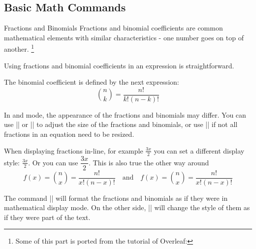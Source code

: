\subsection{Basic Math Commands}

\begin{frame}[fragile]{Fractions and Binomials}
Fractions and binomial coefficients are common mathematical elements with similar characteristics - one number goes on top of another. \footnote[1]{Some of this part is ported from the tutorial of Overleaf: } 

\begin{command}
\begin{LCL}
\end{LCL}
\end{command}

Using fractions and binomial coefficients in an expression is straightforward.

\begin{latexexample}
The binomial coefficient is defined by the next expression:
\[ \binom{n}{k} = \frac{n!}{k!(n-k)!} \]
\end{latexexample}

\end{frame}

\begin{frame}[fragile]

In  and  mode, the appearance of the fractions and binomials may differ. You can use \LC|\displaystyle| or \LC|\textstyle| to adjust the size of the fractions and binomials, or use \LC|\dfrac| if not all fractions in an equation need to be resized.

\pause

\begin{latexexample}
When displaying fractions in-line, for example $\frac{3x}{2}$
you can set a different display style:  $ \displaystyle \frac{3x}{2} $.
Or you can use $\dfrac{3x}{2}$. This is also true the other way around
\[ f(x)=\binom{n}{x}=\frac{n!}{x!(n-x)!} \quad \textrm{and} \quad
   f(x)=\textstyle\binom{n}{x}=\frac{n!}{x!(n-x)!} \]
\end{latexexample}

\pause

The command \LC|\displaystyle| will format the fractions and binomials as if they were in mathematical display mode. On the other side, \LC|\textstyle| will change the style of them as if they were part of the text.

\end{frame}

